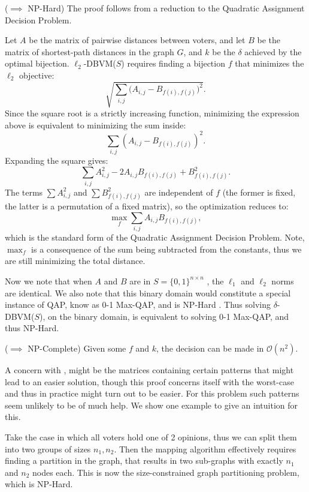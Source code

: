 \begin{proofc}{}
 ($\implies$ NP-Hard) The proof follows from a reduction to the Quadratic Assignment Decision Problem.

  Let $A$ be the matrix of pairwise distances between voters, and let $B$ be the matrix of shortest-path distances in the graph $G$, and $k$ be the $\delta$ achieved by the optimal bijection. $\ell_2$-DBVM($S$) requires finding a bijection $f$ that minimizes the $\ell_2$ objective:
  $$
    \sqrt{\sum_{i,j} \bigl(A_{i,j} - B_{f(i),f(j)}\bigr)^2}.
  $$
  Since the square root is a strictly increasing function, minimizing the expression above is equivalent to minimizing the sum inside:
  $$
    \sum_{i,j} (A_{i,j} - B_{f(i),f(j)})^2.
  $$
  Expanding the square gives:
  $$
    \sum_{i,j} A_{i,j}^2 - 2 A_{i,j} B_{f(i),f(j)} + B_{f(i),f(j)}^2.
  $$
  The terms $\sum A_{i,j}^2$ and $\sum B_{f(i),f(j)}^2$ are independent of $f$ (the former is fixed, the latter is a permutation of a fixed matrix), so the optimization reduces to:
  $$
    \max_f \sum_{i,j} A_{i,j} B_{f(i),f(j)},
  $$
  which is the standard form of the Quadratic Assignment Decision Problem. Note, $\max_f$ is a consequence of the sum being subtracted from the constants, thus we are still minimizing the total distance.

  Now we note that when $A$ and $B$ are in $S= \{0,1\}^{n \times n}$ , the
  $\ell_1$ and $\ell_2$ norms are identical. We also note that this binary
  domain would constitute a special instance of QAP, know as 0-1 Max-QAP, and
  is NP-Hard \cite{nagarajanMaximumQuadraticAssignment}. Thus solving
  $\delta$-DBVM($S$), on the binary domain, is equivalent to solving 0-1
  Max-QAP, and thus NP-Hard.

  ($\implies$ NP-Complete) Given some $f$ and $k$, the decision can be made in $\mathcal{O}(n^2)$.

\end{proofc}

A concern with , might be the matrices
containing certain patterns that might lead to an easier solution, though
this proof concerns itself with the worst-case and thus
in practice might turn out to be easier. For this problem such patterns seem
unlikely to be of much help. We show one example to give an intuition for this.

Take the case in which all voters hold one of 2 opinions, thus we can split
them into two groups of sizes $n_1, n_2$. Then the mapping algorithm
effectively requires finding a partition in the graph, that results in two
sub-graphs with exactly $n_1$ and $n_2$ nodes each. This is now the
size-constrained graph partitioning problem, which is NP-Hard. 

